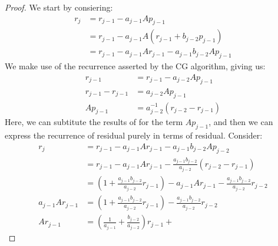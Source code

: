 \documentclass[]{article}
\theoremstyle{definition}
\begin{document}
            \begin{proof}
                We start by consiering: 
                \begin{align}
                    r_j &= r_{j - 1} - a_{j -1 }Ap_{j - 1}
                    \\
                    & =r_{j - 1} - a_{j - 1} A(r_{j - 1} + b_{j - 2}p_{j - 1})
                    \\
                    &= r_{j - 1} - a_{j - 1}Ar_{j - 1} - a_{j - 1}b_{j - 2}Ap_{j - 1}
                \end{align}
                We make use of the recurrence asserted by the CG algorithm, giving us: 
                \begin{align}
                    r_{j - 1} &= r_{j - 1} - a_{j - 2}Ap_{j - 1}
                    \\
                    r_{j - 1} - r_{j - 1} &= a_{j - 2} Ap_{j - 1}
                    \\
                    Ap_{j - 1} &= a^{-1}_{j -2} 
                    \left(
                        r_{j - 2} - r_{j - 1}
                    \right)
                \end{align}
                Here, we can subtitute the results of for the term $Ap_{j - 1}$, and then we can express the recurrence of residual purely in terms of residual. Consider: 
                \begin{align}
                    r_{j} &= r_{j - 1} - a_{j - 1}Ar_{j - 1} - a_{j - 1}b_{j - 2}Ap_{j - 2}
                    \\
                    &= 
                    r_{j - 1} - a_{j - 1}Ar_{j - 1} - \frac{a_{j-1}b_{j-2}}{a_{j-2}}\left(
                        r_{j - 2} - r_{j - 1}
                    \right)
                    \\
                    &= \left(
                        1 + \frac{a_{j - 1}b_{j -2}}{a_{j - 2}}r_{j - 1}
                    \right)- a_{j - 1}Ar_{j - 1} - \frac{a_{j-1}b_{j-2}}{a_{j-2}}r_{j - 2}
                    \\
                    a_{j - 1}Ar_{j - 1} &= 
                    \left(
                        1 + \frac{a_{j - 1}b_{j -2}}{a_{j - 2}}r_{j - 1}
                    \right)
                    - \frac{a_{j-1}b_{j-2}}{a_{j-2}}r_{j - 2}
                    \\
                    Ar_{j - 1} &=
                    \left(
                        \frac{1}{a_{j - 1}} + \frac{b_{j - 2}}{a_{j- 2}}
                    \right)r_{j - 1} + 

\end{align}
\end{proof}
\end{document}
